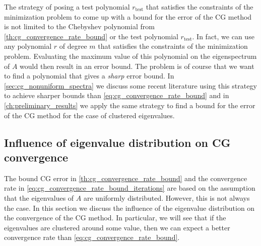 The strategy of posing a test polynomial $r_{\textrm{test}}$ that satisfies the constraints of the minimization problem to come up with a bound for the error of the CG method is not limited to the Chebyshev polynomial from \cref{th:cg_convergence_rate_bound} or the test polynomial $r_{\textrm{test}}$. In fact, we can use any polynomial $r$ of degree $m$ that satisfies the constraints of the minimization problem. Evaluating the maximum value of this polynomial on the eigenspectrum of $A$ would then result in an error bound. The problem is of course that we want to find a polynomial that gives a \textit{sharp} error bound. In \cref{sec:cg_nonuniform_spectra} we discuss some recent literature using this strategy to achieve sharper bounds than \cref{eq:cg_convergence_rate_bound} and in \cref{ch:preliminary_results} we apply the same strategy to find a bound for the error of the CG method for the case of clustered eigenvalues.

\subsection{Influence of eigenvalue distribution on CG convergence}\label{sec:cg_eigenvalue_distribution}
The bound CG error in \cref{th:cg_convergence_rate_bound} and the convergence rate in \cref{eq:cg_convergence_rate_bound_iterations} are based on the assumption that the eigenvalues of $A$ are uniformly distributed. However, this is not always the case. In this section we discuss the influence of the eigenvalue distribution on the convergence of the CG method. In particular, we will see that if the eigenvalues are clustered around some value, then we can expect a better convergence rate than \cref{eq:cg_convergence_rate_bound}.

